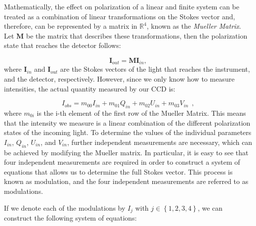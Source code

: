 Mathematically, the effect on polarization of a linear and finite system can be treated as a combination of linear transformations on the Stokes vector and, therefore, can be represented by a matrix in $\mathbb{R}^4$, known as the \textit{Mueller Matrix}. Let $\textbf{M}$ be the matrix that describes these transformations, then the polarization state that reaches the detector follows:

\begin{equation}
  \textbf{I}_{out} = \textbf{M}\textbf{I}_{in},
\end{equation}
where $\textbf{I}_{in}$ and $\textbf{I}_{out}$ are the Stokes vectors of the light that reaches the instrument, and the detector, respectively. However, since we only know how to measure intensities, the actual quantity measured by our CCD is: 

\begin{equation}
  I_{obs} = m_{00}I_{in} + m_{01}Q_{in} + m_{02}U_{in} + m_{03}V_{in} \ \ ,
\end{equation}
where $m_{0i}$ is the i-th element of the first row of the Mueller Matrix. This means that the intensity we measure is a linear combination of the different polarization states of the incoming light. To determine the values of the individual parameters $I_{in}$, $Q_{in}$, $U_{in}$, and $V_{in}$, further independent measurements are necessary, which can be achieved by modifying the Mueller matrix. In particular, it is easy to see that four independent measurements are required in order to construct a system of equations that allows us to determine the full Stokes vector. This process is known as modulation, and the four independent measurements are referred to as modulations.

If we denote each of the modulations by $I _ j$ with $j \in \left\{ 1, 2, 3, 4\right\}$, we can construct the following system of equations:

